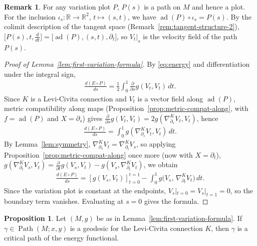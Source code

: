 \documentclass{amsart}
\newcommand{\R}{\mathbb{R}}
\DeclareMathOperator{\Path}{Path}
\DeclareMathOperator{\ad}{ad}
\theoremstyle{definition}
\newtheorem{rem}[thm]{Remark}
\newtheorem{prop}[thm]{Proposition}
\begin{document}
\begin{rem}\label{rem:variation-velocity}
For any variation plot $P$, $P(s)$ is a path on $M$ and hence a plot.
For the inclusion $\iota_s \colon \R \to \R^2$, $t \mapsto (s, t)$,
we have $\ad(P) \circ \iota_s = P(s)$. By the colimit description of the
tangent space (Remark~\ref{rem:tangent-structure-2}),
$\bigl[P(s), t, \tfrac{d}{dt}\bigr] = \bigl[\ad(P), (s,t), \partial_t\bigr]$,
so $V_t|_{s}$ is the velocity field of the path $P(s)$.
\end{rem}

\begin{proof}[Proof of Lemma~\ref{lem:first-variation-formula}]
  By \eqref{eq:energy} and differentiation under the integral sign,
  \begin{align*}
      \frac{d(E \circ P)}{ds}
        = \frac{1}{2} \int_0^1 \frac{\partial}{\partial s} g(V_t, V_t) \, dt.
  \end{align*}
  Since $K$ is a Levi-Civita connection and $V_t$ is a vector field along
  $\ad(P)$, metric compatibility along maps
  (Proposition~\ref{prop:metric-compat-along}, with $f = \ad(P)$ and
  $X = \partial_s$) gives
  $\frac{\partial}{\partial s} g(V_t, V_t) = 2g(\nabla^{K}_{\partial_s} V_t, V_t)$,
  hence
  \begin{align*}
      \frac{d(E \circ P)}{ds}
        = \int_0^1 g(\nabla^{K}_{\partial_s} V_t, V_t) \, dt.
  \end{align*}
  By Lemma~\ref{lem:symmetry},
  $\nabla^{K}_{\partial_s} V_t = \nabla^{K}_{\partial_t} V_s$, so applying
  Proposition~\ref{prop:metric-compat-along} once more (now with
  $X = \partial_t$),
  $g(\nabla^{K}_{\partial_t} V_s, V_t)
  = \frac{\partial}{\partial t} g(V_s, V_t)
  - g(V_s, \nabla^{K}_{\partial_t} V_t)$, we obtain
  \begin{align*}
      \frac{d(E \circ P)}{ds}
        = \left[ g(V_s, V_t) \right]_{t=0}^{t=1}
           - \int_0^1 g\bigl(V_s,\, \nabla^{K}_{\partial_t} V_t\bigr) \, dt.
  \end{align*}
  Since the variation plot is constant at the endpoints,
  $V_s|_{t=0} = V_s|_{t=1} = 0$, so the boundary term vanishes.
  Evaluating at $s = 0$ gives the formula.
\end{proof}

\begin{prop}\label{prop:geodesic-critical-path}
  Let $(M, g)$ be as in Lemma~\ref{lem:first-variation-formula}.
  If $\gamma \in \Path(M; x, y)$ is a geodesic for the Levi-Civita connection
  $K$, then $\gamma$ is a critical path of the energy functional.
\end{prop}
\end{document}

